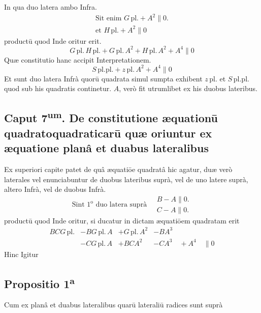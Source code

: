 \documentclass[11pt,a4paper]{article}
\begin{document}
In qua duo latera ambo Infra.
\[ \begin{array}{l} \text{Sit enim } G\,\mathrm{pl.} + A^{2} \parallel 0. \\ \text{et } H\,\mathrm{pl.} + A^{2} \parallel 0 \end{array} \]
productū quod Inde oritur erit.
\[ G\,\mathrm{pl.}\,H\,\mathrm{pl.} + G\,\mathrm{pl.}\,A^{2} + H\,\mathrm{pl.}\,A^{2} + A^{4} \parallel 0 \]
Quæ constitutio hanc accipit Interpretationem.
\[ S\,\mathrm{pl.pl.} + z\,\mathrm{pl.}\,A^{2} + A^{4} \parallel 0 \]
Et sunt duo latera Infrà quorū quadrata simul sumpta exhibent $z\,\mathrm{pl.}$ et $S\,\mathrm{pl.pl.}$ quod sub his quadratis continetur. $A$, verò fit utrumlibet ex his duobus lateribus.

\subsection*{Caput 7\textsuperscript{um}. De constitutione æquationū quadratoquadraticarū quæ oriuntur ex æquatione planâ et duabus lateralibus}

Ex superiori capite patet de quâ æquatiōe quadratâ hic agatur, duæ verò laterales vel enunciabuntur de duobus lateribus suprà, vel de uno latere suprà, altero Infrà, vel de duobus Infrà.
\[ \text{Sint } 1^{\mathrm{o}} \text{ duo latera suprà} \quad \begin{array}{l} B - A \parallel 0. \\ C - A \parallel 0. \end{array} \]
productū quod Inde oritur, si ducatur in dictam æquatiōem quadratam erit
\[ \begin{array}{llll} BCG\,\mathrm{pl.} & - BG\,\mathrm{pl.}\,A & + G\,\mathrm{pl.}\,A^{2} & - BA^{3} \\ & - CG\,\mathrm{pl.}\,A & + BCA^{2} & - CA^{3} \quad + A^{4} \quad \parallel 0 \end{array} \]
Hinc Igitur

\subsection*{Propositio 1\textsuperscript{a}}

Cum ex planâ et duabus lateralibus quarū lateraliū radices sunt suprà
\end{document}
